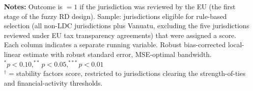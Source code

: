 \begin{table}[htbp]
\begin{tabular}{l*{5}{c}}
                                                                                                                                                     \bottomrule \end{tabular}                                                                                                           \begin{minipage}{0.95\textwidth} \footnotesize                                                                 {\bf Notes:} Outcome is $ = 1 $ if the jurisdiction was reviewed                                      by the EU (the first stage of the fuzzy RD design). Sample: jurisdictions                                                  eligible for rule-based selection (all non-LDC jurisdictions plus                                                   Vanuatu, excluding the five jurisdictions reviewed under EU tax                                                  transparency agreements) that were assigned a score. Each column                                                     indicates a separate running variable. Robust bias-corrected local-linear estimate with robust standard error, MSE-optimal bandwidth.                                                                   \\ $ ^{*} p<0.10,  ^{**} p<0.05,  ^{***} p<0.01 $                                                   \\ $ ^{\dagger} $ = stability factors score, restricted                                                  to jurisdictions clearing the strength-of-ties and                                                    financial-activity thresholds.              \end{minipage} \end{table}
